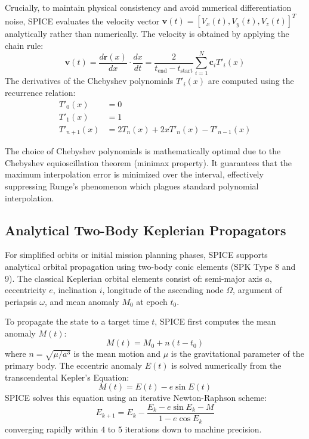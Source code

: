 \documentclass{acta}
\begin{document}
Crucially, to maintain physical consistency and avoid numerical differentiation noise, SPICE evaluates the velocity vector $\mathbf{v}(t) = [V_x(t), V_y(t), V_z(t)]^T$ analytically rather than numerically. The velocity is obtained by applying the chain rule:
\begin{equation}
\mathbf{v}(t) = \frac{d\mathbf{r}(x)}{dx} \cdot \frac{dx}{dt} = \frac{2}{t_{\text{end}} - t_{\text{start}}} \sum_{i=1}^N \mathbf{c}_i T'_i(x)
\end{equation}
The derivatives of the Chebyshev polynomials $T'_i(x)$ are computed using the recurrence relation:
\begin{align}
T'_0(x) &= 0 \\
T'_1(x) &= 1 \\
T'_{n+1}(x) &= 2 T_n(x) + 2x T'_n(x) - T'_{n-1}(x)
\end{align}

The choice of Chebyshev polynomials is mathematically optimal due to the Chebyshev equioscillation theorem (minimax property). It guarantees that the maximum interpolation error is minimized over the interval, effectively suppressing Runge's phenomenon which plagues standard polynomial interpolation.

\subsection{Analytical Two-Body Keplerian Propagators}
For simplified orbits or initial mission planning phases, SPICE supports analytical orbital propagation using two-body conic elements (SPK Type 8 and 9). The classical Keplerian orbital elements consist of: semi-major axis $a$, eccentricity $e$, inclination $i$, longitude of the ascending node $\Omega$, argument of periapsis $\omega$, and mean anomaly $M_0$ at epoch $t_0$.

To propagate the state to a target time $t$, SPICE first computes the mean anomaly $M(t)$:
\begin{equation}
M(t) = M_0 + n(t - t_0)
\end{equation}
where $n = \sqrt{\mu / a^3}$ is the mean motion and $\mu$ is the gravitational parameter of the primary body. The eccentric anomaly $E(t)$ is solved numerically from the transcendental Kepler's Equation:
\begin{equation}
M(t) = E(t) - e \sin E(t)
\end{equation}
SPICE solves this equation using an iterative Newton-Raphson scheme:
\begin{equation}
E_{k+1} = E_k - \frac{E_k - e \sin E_k - M}{1 - e \cos E_k}
\end{equation}
converging rapidly within $4$ to $5$ iterations down to machine precision.
\end{document}
